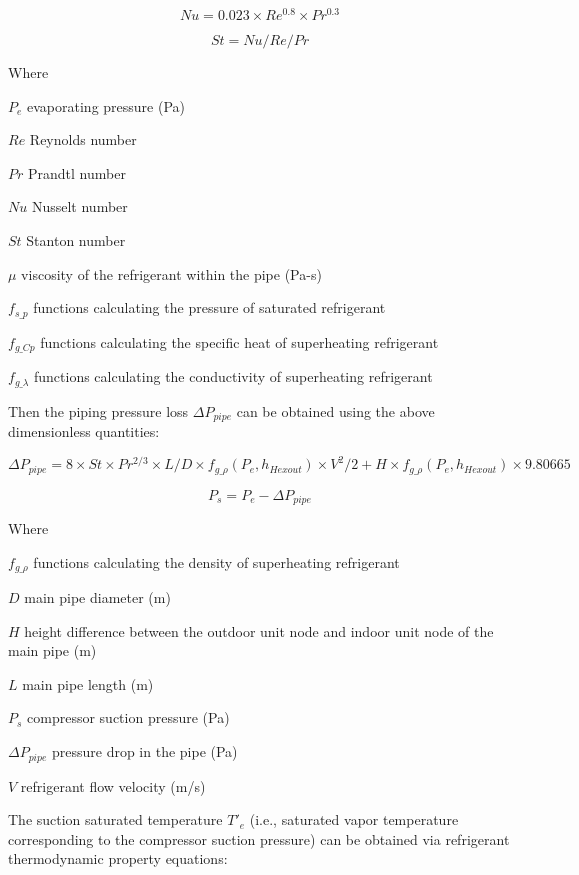\begin{equation}
  Nu=0.023\times{Re^{0.8}\times{Pr^{0.3}}}
\end{equation}

\begin{equation}
  St=Nu/Re/Pr
\end{equation}

Where

$P_e$ evaporating pressure (Pa) 

$Re$ Reynolds number 

$Pr$ Prandtl number 

$Nu$ Nusselt number 

$St$ Stanton number 

$\mu$ viscosity of the refrigerant within the pipe (Pa-s)

$f_{s\_p}$ functions calculating the pressure of saturated refrigerant 

$f_{g\_Cp}$ functions calculating the specific heat of superheating refrigerant 

$f_{g\_\lambda}$ functions calculating the conductivity of superheating refrigerant 

Then the piping pressure loss $\Delta{P_{pipe}}$ can be obtained using the above dimensionless quantities:

\begin{equation}
  \Delta{P_{pipe}}=8\times{St}\times{Pr^{2/3}}\times{L/D}\times{f_{g\_\rho}(P_e,h_{Hexout})}\times{V^2}/2+H\times{f_{g\_\rho}(P_e,h_{Hexout})}\times9.80665
\end{equation}

\begin{equation}
  P_s=P_e-\Delta{P_{pipe}}
\end{equation}

Where

$f_{g\_\rho}$	functions calculating the density of superheating refrigerant 

$D$ main pipe diameter (m) 

$H$ height difference between the outdoor unit node and indoor unit node of the main pipe (m)

$L$ main pipe length (m) 

$P_s$ compressor suction pressure (Pa) 

$\Delta{P_{pipe}}$ pressure drop in the pipe (Pa)

$V$ refrigerant flow velocity (m/s)

The suction saturated temperature $T'_e$ (i.e., saturated vapor temperature corresponding to the compressor suction pressure) can be obtained via refrigerant thermodynamic property equations:


